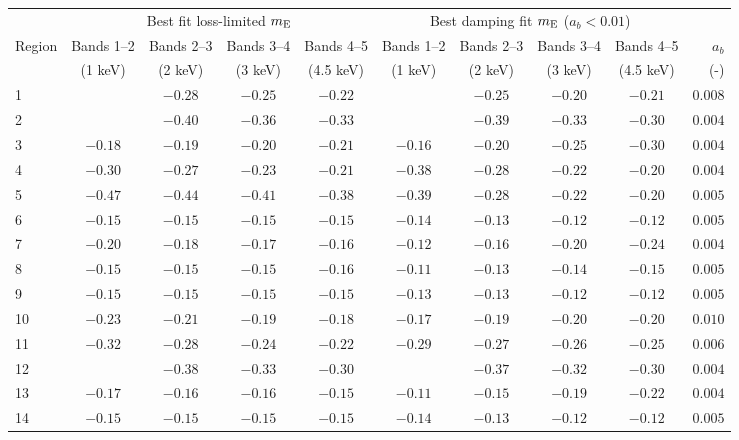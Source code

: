 \begin{tabular}{@{}l cccc cccc r@{}}
\toprule
{} & \multicolumn{4}{c}{Best fit loss-limited $m_\mathrm{E}$}
   & \multicolumn{4}{c}{Best damping fit $m_\mathrm{E}$ ($a_b < 0.01$)} \\
\cmidrule(lr){2-5} \cmidrule(l){6-10}

Region & Bands 1--2 & Bands 2--3 & Bands 3--4 & Bands 4--5
       & Bands 1--2 & Bands 2--3 & Bands 3--4 & Bands 4--5 & $a_b$ \\ [0.2em]
{} & (1 keV) & (2 keV) & (3 keV) & (4.5 keV)
   & (1 keV) & (2 keV) & (3 keV) & (4.5 keV) & (-) \\

\midrule
1  &         & $-0.28$ & $-0.25$ & $-0.22$ &         & $-0.25$ & $-0.20$ & $-0.21$ & $0.008$ \\
2  &         & $-0.40$ & $-0.36$ & $-0.33$ &         & $-0.39$ & $-0.33$ & $-0.30$ & $0.004$ \\
3  & $-0.18$ & $-0.19$ & $-0.20$ & $-0.21$ & $-0.16$ & $-0.20$ & $-0.25$ & $-0.30$ & $0.004$ \\
\cmidrule{1-10}
4  & $-0.30$ & $-0.27$ & $-0.23$ & $-0.21$ & $-0.38$ & $-0.28$ & $-0.22$ & $-0.20$ & $0.004$ \\
5  & $-0.47$ & $-0.44$ & $-0.41$ & $-0.38$ & $-0.39$ & $-0.28$ & $-0.22$ & $-0.20$ & $0.005$ \\
6  & $-0.15$ & $-0.15$ & $-0.15$ & $-0.15$ & $-0.14$ & $-0.13$ & $-0.12$ & $-0.12$ & $0.005$ \\
7  & $-0.20$ & $-0.18$ & $-0.17$ & $-0.16$ & $-0.12$ & $-0.16$ & $-0.20$ & $-0.24$ & $0.004$ \\
8  & $-0.15$ & $-0.15$ & $-0.15$ & $-0.16$ & $-0.11$ & $-0.13$ & $-0.14$ & $-0.15$ & $0.005$ \\
9  & $-0.15$ & $-0.15$ & $-0.15$ & $-0.15$ & $-0.13$ & $-0.13$ & $-0.12$ & $-0.12$ & $0.005$ \\
10 & $-0.23$ & $-0.21$ & $-0.19$ & $-0.18$ & $-0.17$ & $-0.19$ & $-0.20$ & $-0.20$ & $0.010$ \\
\cmidrule{1-10}
11 & $-0.32$ & $-0.28$ & $-0.24$ & $-0.22$ & $-0.29$ & $-0.27$ & $-0.26$ & $-0.25$ & $0.006$ \\
12 &         & $-0.38$ & $-0.33$ & $-0.30$ &         & $-0.37$ & $-0.32$ & $-0.30$ & $0.004$ \\
13 & $-0.17$ & $-0.16$ & $-0.16$ & $-0.15$ & $-0.11$ & $-0.15$ & $-0.19$ & $-0.22$ & $0.004$ \\
\cmidrule{1-10}
14 & $-0.15$ & $-0.15$ & $-0.15$ & $-0.15$ & $-0.14$ & $-0.13$ & $-0.12$ & $-0.12$ & $0.005$ \\

\end{tabular}
